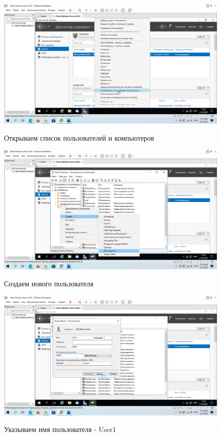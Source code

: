 \documentclass[a4paper]{article}
\begin{document}
  \begin{figure}[H]
    \centering
    \includegraphics[width=\textwidth]{11_0096}
    \label{img:96}
    \caption{Открываем список пользователей и компьютеров}
  \end{figure}

  \begin{figure}[H]
    \centering
    \includegraphics[width=\textwidth]{11_0097}
    \label{img:97}
    \caption{Создаем нового пользователя}
  \end{figure}

  \begin{figure}[H]
    \centering
    \includegraphics[width=\textwidth]{11_0098}
    \label{img:98}
    \caption{Указываем имя пользователя - User1}
  \end{figure}
\end{document}
